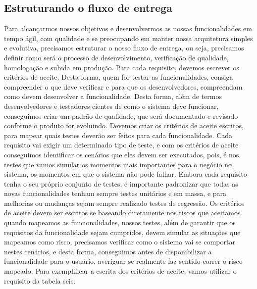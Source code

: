     \subsection{Estruturando o fluxo de entrega}
      Para alcançarmos nossos objetivos e desenvolvermos as nossas funcionalidades
      em tempo ágil, com qualidade e se preocupando em manter nossa arquitetura
      simples e evolutiva, precisamos estruturar o nosso fluxo de entrega, ou seja,
      precisamos definir como será o processo de desenvolvimento, verificação de
      qualidade, homologação e subida em produção. \newline
      Para cada requisito, devemos escrever os critérios de aceite. Desta forma,
      quem for testar as funcionalidades, consiga compreender o que deve verificar
      e para que os desenvolvedores, compreendam como devem desenvolver a
      funcionalidade. Desta forma, além de termos desenvolvedores e testadores
      cientes de como o sistema deve funcionar, conseguimos criar um padrão de
      qualidade, que será documentado e revisado conforme o produto for evoluindo.
      Devemos criar os critérios de aceite escritos, para mapear quais testes deverão
      ser feitos para cada funcionalidade. Cada requisito vai exigir um determinado
      tipo de teste, e com os critérios de aceite conseguimos identificar os cenários
      que eles devem ser executados, pois, é nos testes que vamos simular os momentos
      mais importantes para o negócio no sistema, os momentos em que o sistema não
      pode falhar. Embora cada requisito tenha o seu próprio conjunto de testes,
      é importante padronizar que todas as novas funcionalidades tenham sempre testes
      unitários e em massa, e para melhorias ou mudanças sejam sempre realizado testes
      de regressão. Os critérios de aceite devem ser escritos se baseando diretamente
      nos riscos que aceitamos quando mapeamos as funcionalidades, nossos testes,
      além de garantir que os requisitos da funcionalidade sejam cumpridos, devem
      simular as situações que mapeamos como risco, precisamos verificar como o sistema
      vai se comportar nestes cenários, e desta forma, conseguimos antes de disponibilizar
      a funcionalidade para o usuário, averiguar se realmente faz sentido correr
      o risco mapeado. Para exemplificar a escrita dos critérios de aceite, vamos
      utilizar o requisito da tabela seis. \newline

